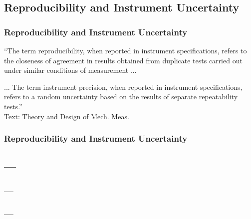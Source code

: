 \documentclass[fleqn]{beamer} %
\newcommand{\sectionIIIsubsectionIIItitle}{Reproducibility and Instrument Uncertainty}
\newcommand{\sectionIIIsubsectionIVtitle}{---}
\begin{document}
		\subsection{\sectionIIIsubsectionIIItitle}\label{sectionIIIsubsectionIII}

			\begin{frame}
				\frametitle{\sectionIIIsubsectionIIItitle}

				``The term {\GR reproducibility}, when reported in instrument specifications, refers to the closeness of
				agreement in results obtained from duplicate tests carried out under similar conditions of
				measurement ... \vspcc

				... The term {\PR instrument precision}, when reported in instrument specifications, refers to a random
				uncertainty based on the results of separate repeatability tests.'' \vspace{10mm} \\

				{\tiny Text: Theory and Design of Mech. Meas.}
		
			\end{frame}

			\begin{frame}
				\frametitle{\sectionIIIsubsectionIIItitle}



			\end{frame}

		\subsection{\sectionIIIsubsectionIVtitle}\label{sectionIIIsubsectionIV}	

			\begin{frame}
				\frametitle{\sectionIIIsubsectionIVtitle}

			


			\end{frame}

			\begin{frame}
				\frametitle{\sectionIIIsubsectionIVtitle}
				


			\end{frame}
\end{document}
